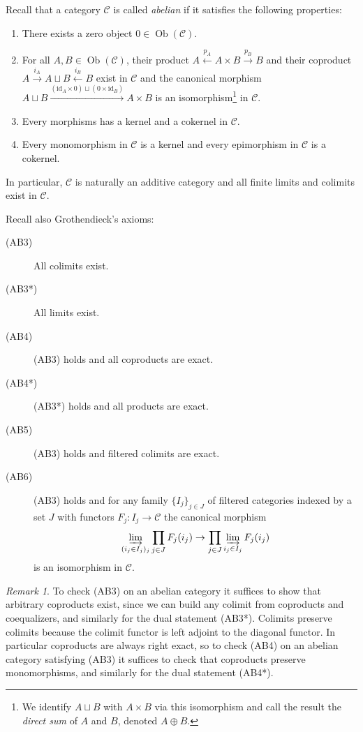 \documentclass[11pt,A4]{article}
\theoremstyle{plain}
\theoremstyle{definition}
\theoremstyle{remark}
\newtheorem{rem}[thm]{Remark}
\newcommand{\C}{\mathscr{C}}
\DeclareMathOperator{\Ob}{Ob}
\newcommand{\op}{\oplus}
\newcommand{\id}{\mathrm{id}}
\begin{document}
Recall that a category $\C$ is called \textit{abelian} if it satisfies the following properties:
\begin{enumerate}[label=\roman*)]
    \item There exists a zero object $0\in \Ob(\C)$.
    \item For all $A,B\in \Ob(\C)$, their product $A\xleftarrow{p_{A}} A\times B\xrightarrow{p_{B}} B$ and their coproduct $A\xrightarrow{i_{A}}A\sqcup B\xleftarrow{i_{B}} B$ exist in $\C$ and the canonical morphism $A\sqcup B\xrightarrow{(\id_{A}\times 0) \sqcup (0\times \id_{B})} A\times B$ is an isomorphism\footnote{We identify $A\sqcup B$ with $A\times B$ via this isomorphism and call the result the \textit{direct sum} of $A$ and $B$, denoted $A\op B$.} in $\C$.
    \item Every morphisms has a kernel and a cokernel in $\C$.
    \item Every monomorphism in $\C$ is a kernel and every epimorphism in $\C$ is a cokernel.
\end{enumerate}

In particular, $\C$ is naturally an additive category and all finite limits and colimits exist in $\C$.

Recall also Grothendieck's axioms:
\begin{description}
    \item[(AB3)] All colimits exist.
    \item[(AB3*)] All limits exist.
    \item[(AB4)] (AB3) holds and all coproducts are exact.
    \item[(AB4*)] (AB3*) holds and all products are exact.
    \item[(AB5)] (AB3) holds and filtered colimits are exact.
    \item[(AB6)] (AB3) holds and for any family $\{ I_{j}\}_{j\in J}$ of filtered categories indexed by a set $J$ with functors $F_{j}\colon I_{j}\to \C$ the canonical morphism
	\[ \varinjlim_{(i_{j}\in I_{j})_{j}} \prod_{j\in J}F_{j}(i_{j})\to \prod_{j\in J}\varinjlim_{i_{j}\in I_{j}} F_{j}(i_{j}) \]
	is an isomorphism in $\C$.
\end{description}

\begin{rem}
    To check (AB3) on an abelian category it suffices to show that arbitrary coproducts exist, since we can build any colimit from coproducts and coequalizers, and similarly for the dual statement (AB3*).
    Colimits preserve colimits because the colimit functor is left adjoint to the diagonal functor.
    In particular coproducts are always right exact, so to check (AB4) on an abelian category satisfying (AB3) it suffices to check that coproducts preserve monomorphisms, and similarly for the dual statement (AB4*).
\end{rem}
\end{document}
